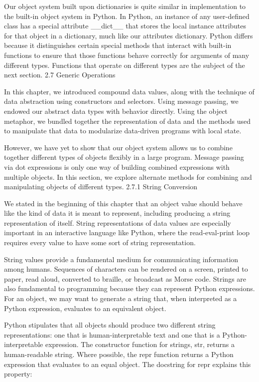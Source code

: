 \documentclass[letterpaper,10pt,dvipdfmx]{sphinxmanual}
\begin{document}
Our object system built upon dictionaries is quite similar in implementation to the built-in object system in Python. In Python, an instance of any user-defined class has a special attribute \_\_dict\_\_ that stores the local instance attributes for that object in a dictionary, much like our attributes dictionary. Python differs because it distinguishes certain special methods that interact with built-in functions to ensure that those functions behave correctly for arguments of many different types. Functions that operate on different types are the subject of the next section.
2.7   Generic Operations

In this chapter, we introduced compound data values, along with the technique of data abstraction using constructors and selectors. Using message passing, we endowed our abstract data types with behavior directly. Using the object metaphor, we bundled together the representation of data and the methods used to manipulate that data to modularize data-driven programs with local state.

However, we have yet to show that our object system allows us to combine together different types of objects flexibly in a large program. Message passing via dot expressions is only one way of building combined expressions with multiple objects. In this section, we explore alternate methods for combining and manipulating objects of different types.
2.7.1   String Conversion

We stated in the beginning of this chapter that an object value should behave like the kind of data it is meant to represent, including producing a string representation of itself. String representations of data values are especially important in an interactive language like Python, where the read-eval-print loop requires every value to have some sort of string representation.

String values provide a fundamental medium for communicating information among humans. Sequences of characters can be rendered on a screen, printed to paper, read aloud, converted to braille, or broadcast as Morse code. Strings are also fundamental to programming because they can represent Python expressions. For an object, we may want to generate a string that, when interpreted as a Python expression, evaluates to an equivalent object.

Python stipulates that all objects should produce two different string representations: one that is human-interpretable text and one that is a Python-interpretable expression. The constructor function for strings, str, returns a human-readable string. Where possible, the repr function returns a Python expression that evaluates to an equal object. The docstring for repr explains this property:
\end{document}
